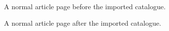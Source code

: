 \documentclass[ecta,nameyear,draft]{econsocart}
\begin{document}
A normal article page before the imported catalogue.
\clearpage
\begingroup
\hoffset=0pt\voffset=0pt

\clearpage
\endgroup
A normal article page after the imported catalogue.
\end{document}
